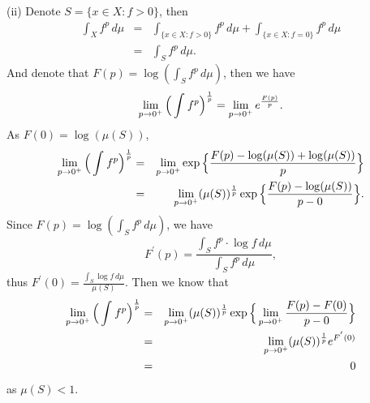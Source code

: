 \documentclass[12pt,a4paper]{ctexart}
\begin{document}
(ii) 
Denote $S = \{x \in X: f > 0\}$, then
\begin{eqnarray*}
    \int_{X}^{} f^{p} \, d \mu & = & \int_{\{x \in X: f > 0\}}^{} f^{p} \, d \mu + \int_{\{x \in X: f = 0\}}^{} f^{p} \, d \mu \\
    & = & \int_{S}^{} f^{p} \, d \mu.
\end{eqnarray*}
And denote that $F(p) = \log (\int_{S}^{} f^{p} \, d \mu)$, then we have
\begin{equation*}
    \lim_{p \to 0^{+}} \Big{(} \int_{}^{} f^{p} \Big{)}^{\frac{1}{p}} = \lim_{p \to 0^{+}} e^{\frac{F(p)}{p}}.
\end{equation*}
As $F(0) = \log(\mu(S))$,
\begin{eqnarray*}
    \lim_{p \to 0^{+}} \Big{(} \int_{}^{} f^{p} \Big{)}^{\frac{1}{p}} & = & \lim_{p \to 0^{+}} \exp \Big{\{} \frac{F(p) - \log(\mu(S)) + \log(\mu(S))}{p} \Big{\}} \\
    & = & \lim_{p \to 0^{+}} (\mu(S))^{\frac{1}{p}} \exp \Big{\{} \frac{F(p) - \log(\mu(S))}{p - 0} \Big{\}}.
\end{eqnarray*}
Since $F(p) = \log (\int_{S}^{} f^{p} \, d \mu)$, we have 
\begin{equation*}
    F^{'}(p) = \frac{\int_{S}^{} f^{p} \cdot \log f \, d \mu}{\int_{S}^{} f^{p} \, d \mu},
\end{equation*}
thus $F^{'}(0) = \frac{\int_{S}^{} \log f \, d \mu}{\mu(S)}$. Then we know that
\begin{eqnarray*}
    \lim_{p \to 0^{+}} \Big{(} \int_{}^{} f^{p} \Big{)}^{\frac{1}{p}} & = & \lim_{p \to 0^{+}} (\mu(S))^{\frac{1}{p}} \exp \Big{\{} \lim_{p \to 0^{+}} \frac{F(p) - F(0)}{p - 0} \Big{\}} \\
    & = & \lim_{p \to 0^{+}} (\mu(S))^{\frac{1}{p}} e^{F^{'}(0)} \\
    & = & 0
\end{eqnarray*}
as $\mu(S) < 1$.
\end{document}
